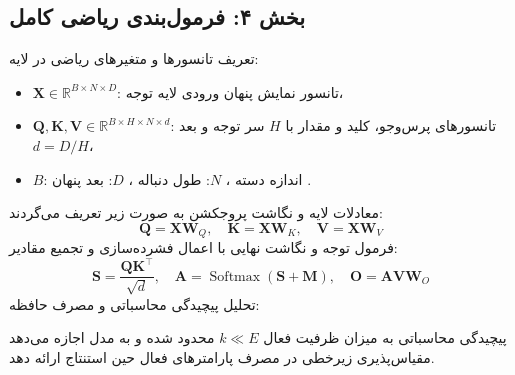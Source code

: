 \subsection*{بخش ۴: فرمول‌بندی ریاضی کامل }
تعریف تانسورها و متغیرهای ریاضی در لایه:
\begin{itemize}
    \item $\mathbf{X} \in \mathbb{R}^{B \times N \times D}$: تانسور نمایش پنهان ورودی لایه توجه،
    \item $\mathbf{Q}, \mathbf{K}, \mathbf{V} \in \mathbb{R}^{B \times H \times N \times d}$: تانسورهای پرس‌وجو، کلید و مقدار با $H$ سر توجه و بعد $d = D/H$،
    \item $B$: اندازه دسته ، $N$: طول دنباله ، $D$: بعد پنهان .
\end{itemize}
معادلات لایه و نگاشت پروجکشن به صورت زیر تعریف می‌گردند:
\begin{equation}
\mathbf{Q} = \mathbf{X} \mathbf{W}_Q, \quad \mathbf{K} = \mathbf{X} \mathbf{W}_K, \quad \mathbf{V} = \mathbf{X} \mathbf{W}_V
\end{equation}
فرمول توجه و نگاشت نهایی با اعمال فشرده‌سازی و تجمیع مقادیر:
\begin{equation}
\mathbf{S} = \frac{\mathbf{Q} \mathbf{K}^\top}{\sqrt{d}}, \quad \mathbf{A} = \operatorname{Softmax}\left( \mathbf{S} + \mathbf{M} \right), \quad \mathbf{O} = \mathbf{A} \mathbf{V} \mathbf{W}_O
\end{equation}
تحلیل پیچیدگی محاسباتی و مصرف حافظه:

پیچیدگی محاسباتی به میزان ظرفیت فعال $k \ll E$ محدود شده و به مدل اجازه می‌دهد مقیاس‌پذیری زیرخطی در مصرف پارامترهای فعال حین استنتاج ارائه دهد.

